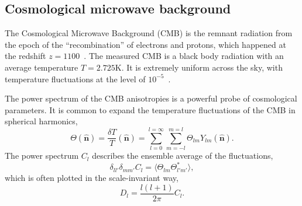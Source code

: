 \documentclass[doublespace,nopageskip]{VTthesis} %
\begin{document}
\subsection{Cosmological microwave background}

The Cosmological Microwave Background (CMB) is the remnant radiation from the epoch of the ``recombination'' of electrons and protons, which happened at the redshift $z = 1100$~\cite{2003moco.book.....D}. The measured CMB is a black body radiation with an average temperature $T = 2.725$K. It is extremely uniform across the sky, with temperature fluctuations at the level of $10^{-5}$~\cite{2002ARA&A..40..171H}. 

The power spectrum of the CMB anisotropies is a powerful probe of cosmological parameters. It is common to expand the temperature fluctuations of the CMB in spherical harmonics,
\begin{equation}
    \Theta(\hat{\bm n}) = \frac{\delta T}{T}(\hat{\bm n}) = \sum^{l=\infty}_{l=0}\sum^{m=l}_{m=-l} \Theta_{lm}Y_{lm}(\hat{\bm n}).
\end{equation}
The power spectrum $C_l$ describes the ensemble average of the fluctuations,
\begin{equation}
    \delta_{ll'}\delta_{mm'}C_l = \langle\Theta_{lm}\Theta^*_{l'm'}\rangle,
\end{equation}
which is often plotted in the scale-invariant way,
\begin{equation}
    D_l = \frac{l(l+1)}{2\pi}C_l.
\end{equation}
\end{document}
